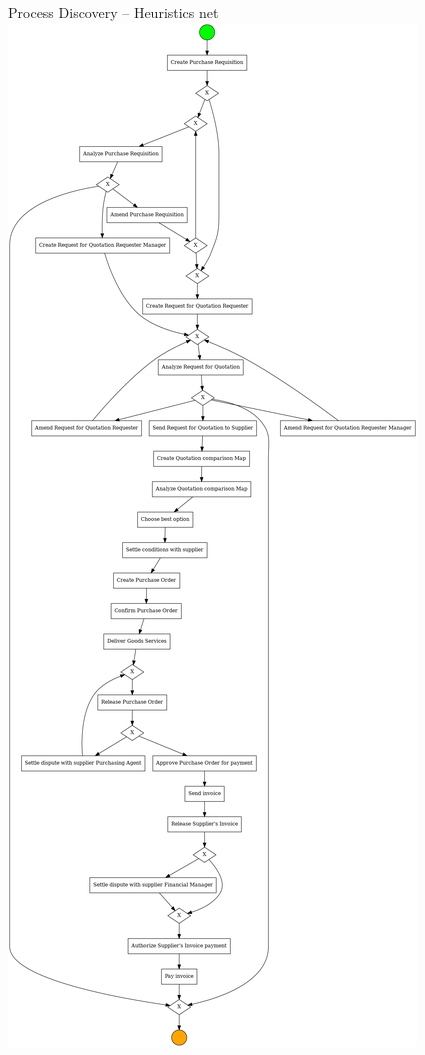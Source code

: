 \documentclass[ignorenonframetext,xcolor=x11names]{beamer}
\begin{document}
\begin{frame}{Process Discovery -- Heuristics net}
\centering
\includegraphics[width=.8\textwidth]{bpmn2.png}
\end{frame}
\end{document}
